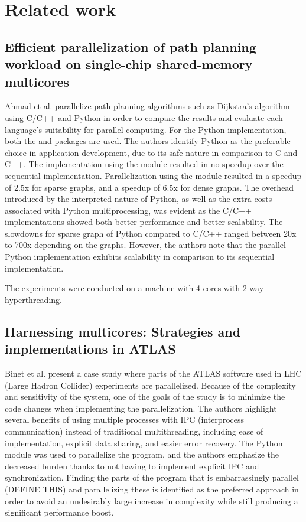 \section{Related work}
\subsection{Efficient parallelization of path planning workload on single-chip shared-memory multicores}
Ahmad et al. \cite{ahmad_2015_efficient_epoppwossm} parallelize path planning algorithms such as Dijkstra's algorithm using C/C++ and
Python in order to compare the results and evaluate each language's suitability for parallel computing. For the Python implementation,
both the  and  packages are used. The authors identify Python as the preferable choice 
in application development, due to its safe nature in comparison to C and C++. The implementation using the 
module resulted in no speedup over the sequential implementation. Parallelization using the  module resulted
in a speedup of 2.5x for sparse graphs, and a speedup of 6.5x for dense graphs. The overhead introduced by the interpreted nature
of Python, as well as the extra costs associated with Python multiprocessing, was evident as the C/C++ implementations showed both
better performance and better scalability. The slowdowns for sparse graph of Python compared to C/C++ ranged between
20x to 700x depending on the graphs.
However, the authors note that the parallel Python implementation exhibits scalability in comparison to its sequential implementation.

The experiments were conducted on a machine with 4 cores with 2-way hyperthreading.


\subsection{Harnessing multicores: Strategies and implementations in ATLAS}
Binet et al. \cite{binet_2010_harnessing_hmsaiia} present a case study where parts of the ATLAS software used in
LHC (Large Hadron Collider) experiments are parallelized. Because of the complexity and sensitivity of the system,
one of the goals of the study is to minimize the code changes when implementing the parallelization. The authors highlight several
benefits of using multiple processes with IPC (interprocess communication) instead of traditional multithreading, including ease of 
implementation, explicit data sharing, and easier error recovery. The Python  module was used to parallelize
the program, and the authors emphasize the decreased burden thanks to not having to implement explicit IPC and synchronization.
Finding the parts of the program that is embarrassingly parallel (DEFINE THIS) and parallelizing these is
identified as the preferred approach in order to avoid an undesirably large increase in complexity while
still producing a significant performance boost.

